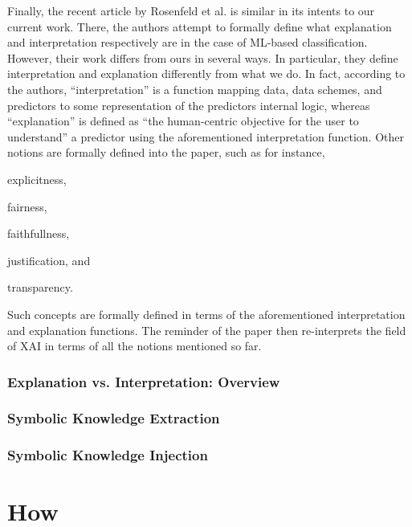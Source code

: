 \documentclass[12pt,a4paper,openright,twoside]{book}
\begin{document}
Finally, the recent article by Rosenfeld et al. \cite{RosenfeldR2019} is similar in its intents to our current work.
%
There, the authors attempt to formally define what explanation and interpretation respectively are in the case of ML-based classification. 
%
However, their work differs from ours in several ways.
%
In particular, they define interpretation and explanation differently from what we do.
%
In fact, according to the authors, ``interpretation'' is a function mapping data, data schemes, and predictors to some representation of the predictors internal logic, whereas ``explanation'' is defined as ``the human-centric objective for the user to understand'' a predictor using the aforementioned interpretation function.
%
Other notions are formally defined into the paper, such as for instance, 
%
\begin{enumerate*}[label=\emph{(\roman{*})}]
	\item explicitness, 
	\item fairness, 
	\item faithfullness,
	\item justification, and
	\item transparency.
\end{enumerate*}
%
Such concepts are formally defined in terms of the aforementioned interpretation and explanation functions.
%
The reminder of the paper then re-interprets the field of XAI in terms of all the notions mentioned so far. 

\section{Explanation vs. Interpretation: Overview}


\section{Symbolic Knowledge Extraction}

\cite{shallow2deep-extraamas2021}
\cite{xailp-woa2019}

\section{Symbolic Knowledge Injection}

\cite{nsc4xai-woa2020}

\part{How}
\label{part:how}
\end{document}
